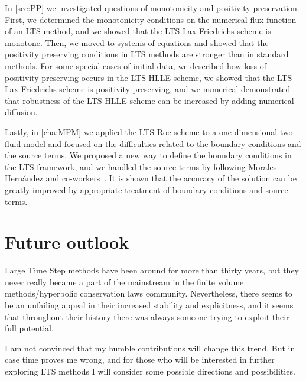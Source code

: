 In \cref{sec:PP} we investigated questions of monotonicity and positivity preservation. First, we determined the monotonicity conditions on the numerical flux function of an LTS method, and we showed that the LTS-Lax-Friedrichs scheme is monotone. Then, we moved to systems of equations and showed that the positivity preserving conditions in LTS methods are stronger than in standard methods. For some special cases of initial data, we described how loss of positivity preserving occurs in the LTS-HLLE scheme, we showed that the LTS-Lax-Friedrichs scheme is positivity preserving, and we numerical demonstrated that robustness of the LTS-HLLE scheme can be increased by adding numerical diffusion.

Lastly, in \cref{cha:MPM} we applied the LTS-Roe scheme to a one-dimensional two-fluid model and focused on the difficulties related to the boundary conditions and the source terms. We proposed a new way to define the boundary conditions in the LTS framework, and we handled the source terms by following Morales-Hern\'{a}ndez and co-workers~\cite{mur06,mor12a,mor12b,mor14,mor17}. It is shown that the accuracy of the solution can be greatly improved by appropriate treatment of boundary conditions and source terms. 

\section{Future outlook}

Large Time Step methods have been around for more than thirty years, but they never really became a part of the mainstream in the finite volume methods/hyperbolic conservation laws community. Nevertheless, there seems to be an unfailing appeal in their increased stability and explicitness, and it seems that throughout their history there was always someone trying to exploit their full potential. 

I am not convinced that my humble contributions will change this trend. But in case time proves me wrong, and for those who will be interested in further exploring LTS methods I will consider some possible directions and possibilities.

